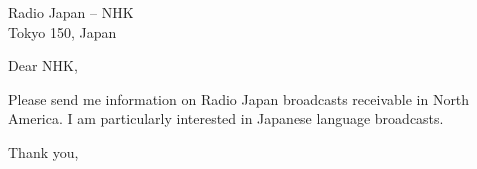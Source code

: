 
\address{MIT Lab for Computer Science, Room 434\\545 Technology Square\\Cambridge, MA
02139} 

\signature{Leigh L. Klotz, Jr.}

\begin{letter}{Radio Japan -- NHK\\
Tokyo 150, Japan}

\opening{Dear NHK,}

	Please send me information on Radio Japan broadcasts receivable in
North America.  I am particularly interested in Japanese language
broadcasts.

\closing{Thank you,}

\end{letter}


